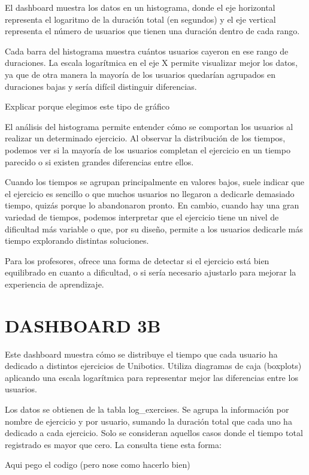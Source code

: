 \documentclass[a4paper, 12pt]{book}
\begin{document}
El dashboard muestra los datos en un histograma, donde el eje horizontal representa el logaritmo de la duración total (en segundos) y el eje vertical representa el número de usuarios que tienen una duración dentro de cada rango.

Cada barra del histograma muestra cuántos usuarios cayeron en ese rango de duraciones. La escala logarítmica en el eje X permite visualizar mejor los datos, ya que de otra manera la mayoría de los usuarios quedarían agrupados en duraciones bajas y sería difícil distinguir diferencias.

Explicar porque elegimos este tipo de gráfico

El análisis del histograma permite entender cómo se comportan los usuarios al realizar un determinado ejercicio. Al observar la distribución de los tiempos, podemos ver si la mayoría de los usuarios completan el ejercicio en un tiempo parecido o si existen grandes diferencias entre ellos. 

Cuando los tiempos se agrupan principalmente en valores bajos, suele indicar que el ejercicio es sencillo o que muchos usuarios no llegaron a dedicarle demasiado tiempo, quizás porque lo abandonaron pronto. En cambio, cuando hay una gran variedad de tiempos, podemos interpretar que el ejercicio tiene un nivel de dificultad más variable o que, por su diseño, permite a los usuarios dedicarle más tiempo explorando distintas soluciones. 

Para los profesores, ofrece una forma de detectar si el ejercicio está bien equilibrado en cuanto a dificultad, o si sería necesario ajustarlo para mejorar la experiencia de aprendizaje.

\section{DASHBOARD 3B}

Este dashboard muestra cómo se distribuye el tiempo que cada usuario ha dedicado a distintos ejercicios de Unibotics. Utiliza diagramas de caja (boxplots) aplicando una escala logarítmica para representar mejor las diferencias entre los usuarios.

Los datos se obtienen de la tabla log\_exercises. Se agrupa la información por nombre de ejercicio y por usuario, sumando la duración total que cada uno ha dedicado a cada ejercicio. Solo se consideran aquellos casos donde el tiempo total registrado es mayor que cero.
La consulta tiene esta forma:

Aqui pego el codigo (pero nose como hacerlo bien)
\end{document}
